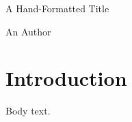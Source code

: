 \documentclass{article}
\begin{document}
\begin{center}
{\Large A Hand-Formatted Title}

An Author
\end{center}
\begin{abstract}
The abstract text.
\end{abstract}
\section{Introduction}
Body text.
\end{document}
